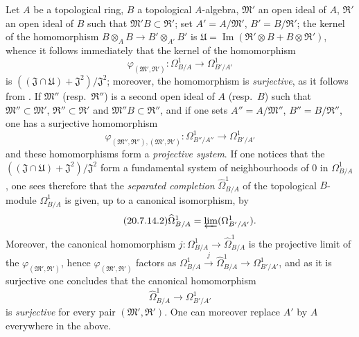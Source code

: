 \begin{env}[20.7.14]
\label{0.20.7.14}
Let $A$ be a topological ring, $B$ a topological $A$-algebra, $\mathfrak{M}'$ an open ideal of $A$, $\mathfrak{R}'$ an open ideal of $B$ such that $\mathfrak{M}'B\subset\mathfrak{R}'$; set $A'=A/\mathfrak{M}'$, $B'=B/\mathfrak{R}'$;
the kernel of the homomorphism $B\otimes_A B\to B'\otimes_{A'} B'$ is $\mathfrak{U}=\operatorname{Im}(\mathfrak{R}'\otimes B+B\otimes\mathfrak{R}')$, whence it follows immediately that the kernel of the homomorphism
\begin{equation}
\tag{20.7.14.1}
  \label{0.20.7.14.1}
  \varphi_{(\mathfrak{M}',\mathfrak{R}')}:\Omega^1_{B/A}\to\Omega^1_{B'/A'}
\end{equation}
is $((\mathfrak{J}\cap\mathfrak{U})+\mathfrak{J}^2)/\mathfrak{J}^2$; moreover, the homomorphism  is \emph{surjective}, as it follows from .
If $\mathfrak{M}''$ (resp.\ $\mathfrak{R}''$) is a second open ideal of $A$ (resp.\ $B$) such that $\mathfrak{M}''\subset\mathfrak{M}'$, $\mathfrak{R}''\subset\mathfrak{R}'$ and $\mathfrak{M}''B\subset\mathfrak{R}''$, and if one sets $A''=A/\mathfrak{M}''$, $B''=B/\mathfrak{R}''$, one has a surjective homomorphism
\[
  \varphi_{(\mathfrak{M}'',\mathfrak{R}''),({\mathfrak{M}',\mathfrak{R}'})}:\Omega^1_{B''/A''}\to\Omega^1_{B'/A'}
\]
and these homomorphisms form a \emph{projective system}.
If one notices that the $((\mathfrak{J}\cap\mathfrak{U})+\mathfrak{J}^2)/\mathfrak{J}^2$ form a fundamental system of neighbourhoods of $0$ in $\Omega^1_{B/A}$, one sees therefore that the \emph{separated completion} $\widehat{\Omega}^1_{B/A}$ of the topological $B$-module $\Omega^1_{B/A}$ is given, up to a canonical isomorphism, by
\begin{equation}
\tag{20.7.14.2}
  \label{0.20.7.14.2}
  \widehat{\Omega}^1_{B/A}=\varprojlim(\Omega^1_{B'/A'}).
\end{equation}
Moreover, the canonical homomorphism $j:\Omega^1_{B/A}\to\widehat{\Omega}^1_{B/A}$ is the projective limit of the $\varphi_{(\mathfrak{M}',\mathfrak{R}')}$, hence $\varphi_{(\mathfrak{M}',\mathfrak{R}')}$ factors as $\Omega^1_{B/A}\xrightarrow{j}\widehat{\Omega}^1_{B/A}\to\Omega^1_{B'/A'}$, and as it is surjective one concludes that the canonical homomorphism
\begin{equation}
\tag{20.7.14.3}
  \label{0.20.7.14.3}
  \widehat{\Omega}^1_{B/A}\to\Omega^1_{B'/A'}
\end{equation}
is \emph{surjective} for every pair $(\mathfrak{M}',\mathfrak{R}')$.
One can moreover replace $A'$ by $A$ everywhere in the above.


\end{env}
